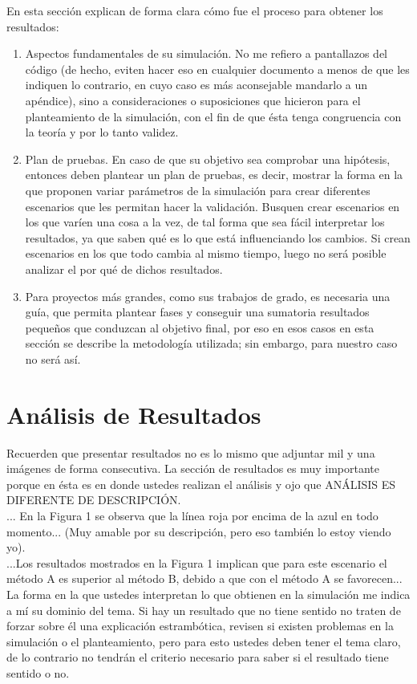 \documentclass[12pt]{article}
\begin{document}
    En esta sección explican de forma clara cómo fue el proceso para obtener los resultados:
    \begin{enumerate}
        \item Aspectos fundamentales de su simulación. No me refiero a pantallazos del código 
        (de hecho, eviten hacer eso en cualquier documento a menos de que les indiquen 
        lo contrario, en cuyo caso es más aconsejable mandarlo a un apéndice), sino a 
        consideraciones o suposiciones que hicieron para el planteamiento de la simulación, 
        con el fin de que ésta tenga congruencia con la teoría y por lo tanto validez. 

        \item Plan de pruebas. En caso de que su objetivo sea comprobar una hipótesis, entonces 
        deben plantear un plan de pruebas, es decir, mostrar la forma en la que proponen 
        variar parámetros de la simulación para crear diferentes escenarios que les permitan 
        hacer la validación. Busquen crear escenarios en los que varíen una cosa a la vez, 
        de tal forma que sea fácil interpretar los resultados, ya que saben qué es lo que está 
        influenciando los cambios. Si crean escenarios en los que todo cambia al mismo 
        tiempo, luego no será posible analizar el por qué de dichos resultados. 

        \item Para proyectos más grandes, como sus trabajos de grado, es necesaria una guía, 
        que permita plantear fases y conseguir una sumatoria resultados pequeños que 
        conduzcan al objetivo final, por eso en esos casos en esta sección se describe la 
        metodología utilizada; sin embargo, para nuestro caso no será así. 
    \end{enumerate}

\section*{Análisis de Resultados}
    Recuerden que presentar resultados no es lo mismo que adjuntar mil y una imágenes de 
    forma consecutiva. La sección de resultados es muy importante porque en ésta es en 
    donde ustedes realizan el análisis y ojo que ANÁLISIS ES DIFERENTE DE DESCRIPCIÓN.\\
    ... En la Figura 1 se observa que la línea roja por encima de la azul en todo 
    momento... (Muy amable por su descripción, pero eso también lo estoy viendo yo).\\
    ...Los resultados mostrados en la Figura 1 implican que para este escenario el método A 
    es superior al método B, debido a que con el método A se favorecen...\\
    La forma en la que ustedes interpretan lo que obtienen en la simulación me indica a mí su 
    dominio del tema. Si hay un resultado que no tiene sentido no traten de forzar sobre él 
    una explicación estrambótica, revisen si existen problemas en la simulación o el 
    planteamiento, pero para esto ustedes deben tener el tema claro, de lo contrario no 
    tendrán el criterio necesario para saber si el resultado tiene sentido o no.
    
\end{document}
